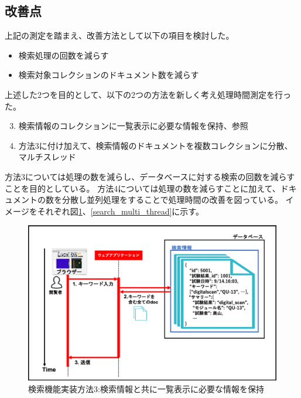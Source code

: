 \subsection{改善点}
上記の測定を踏まえ、改善方法として以下の項目を検討した。
\begin{itemize}
  \item 検索処理の回数を減らす
  \item 検索対象コレクションのドキュメント数を減らす
\end{itemize}

上述した2つを目的として、以下の2つの方法を新しく考え処理時間測定を行った。

\begin{enumerate}
  \setcounter{enumi}{2}
  \item 検索情報のコレクションに一覧表示に必要な情報を保持、参照 
  \item 方法3に付け加えて、検索情報のドキュメントを複数コレクションに分散、マルチスレッド
\end{enumerate}

方法3については処理の数を減らし、データベースに対する検索の回数を減らすことを目的としている。
方法4については処理の数を減らすことに加えて、ドキュメントの数を分散し並列処理をすることで処理時間の改善を図っている。
イメージをそれぞれ図\ref{search_summary_hash}、\ref{search_multi_thread}に示す。

\begin{figure}[bpt]
  \begin{center}
    \includegraphics[width=14cm]{search_summary_hash}
  \caption[検索機能実装方法3:検索情報と共に一覧表示に必要な情報を保持]{検索機能実装方法3:検索情報と共に一覧表示に必要な情報を保持}
  \label{search_summary_hash}
  \end{center}
\end{figure}

